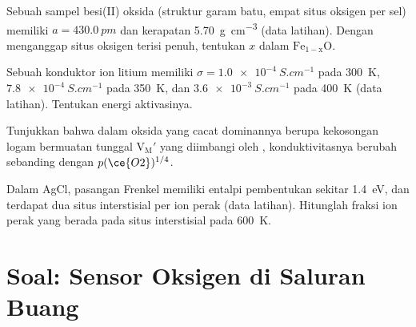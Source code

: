 \begin{exercise}[$\star\star$]\label{exo:b3:solid-state:9}
Sebuah sampel besi(II) oksida (struktur garam batu, empat situs oksigen per sel) memiliki
$a = \qty{430.0}{pm}$ dan kerapatan \qty{5.70}{g.cm^{-3}} (data latihan). Dengan menganggap
situs oksigen terisi penuh, tentukan $x$ dalam $\mathrm{Fe_{1-x}O}$.
\end{exercise}

\begin{exercise}[$\star\star\star$]\label{exo:b3:solid-state:10}
Sebuah konduktor ion litium memiliki $\sigma = \qty{1.0e-4}{S.cm^{-1}}$ pada \qty{300}{K}, $\qty{7.8e-4}{S.cm^{-1}}$ pada \qty{350}{K}, dan
$\qty{3.6e-3}{S.cm^{-1}}$ pada \qty{400}{K} (data latihan). Tentukan energi aktivasinya.
\end{exercise}

\begin{exercise}[$\star\star\star$]\label{exo:b3:solid-state:11}
Tunjukkan bahwa dalam oksida yang cacat dominannya berupa kekosongan logam bermuatan tunggal
$\mathrm{V_M'}$ yang diimbangi oleh , konduktivitasnya berubah sebanding dengan $p(\ce{O2})^{1/4}$.
\end{exercise}

\begin{exercise}[$\star\star\star$]\label{exo:b3:solid-state:12}
Dalam AgCl, pasangan Frenkel memiliki entalpi pembentukan sekitar \qty{1.4}{eV}, dan terdapat
dua situs interstisial per ion perak (data latihan). Hitunglah fraksi
ion perak yang berada pada situs interstisial pada \qty{600}{K}.
\end{exercise}

\section{Soal: Sensor Oksigen di Saluran Buang}

